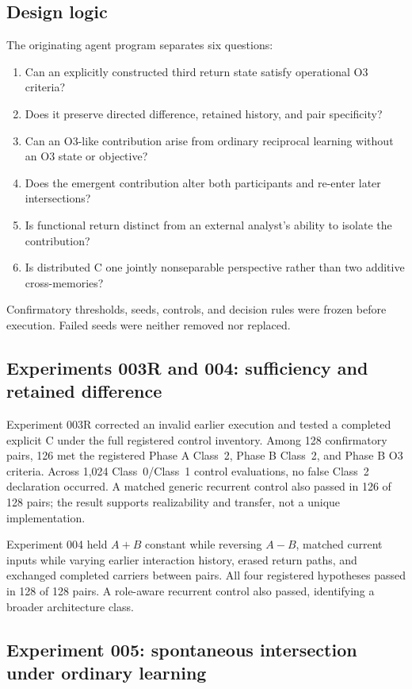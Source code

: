 \documentclass[11pt,a4paper]{article}
\begin{document}
\subsection{Design logic}

The originating agent program separates six questions:
\begin{enumerate}
  \item Can an explicitly constructed third return state satisfy operational O3 criteria?
  \item Does it preserve directed difference, retained history, and pair specificity?
  \item Can an O3-like contribution arise from ordinary reciprocal learning without an O3 state or objective?
  \item Does the emergent contribution alter both participants and re-enter later intersections?
  \item Is functional return distinct from an external analyst's ability to isolate the contribution?
  \item Is distributed C one jointly nonseparable perspective rather than two additive cross-memories?
\end{enumerate}
Confirmatory thresholds, seeds, controls, and decision rules were frozen before execution. Failed seeds were neither removed nor replaced.

\subsection{Experiments 003R and 004: sufficiency and retained difference}

Experiment 003R corrected an invalid earlier execution and tested a completed explicit C under the full registered control inventory. Among 128 confirmatory pairs, 126 met the registered Phase A Class~2, Phase B Class~2, and Phase B O3 criteria. Across 1,024 Class~0/Class~1 control evaluations, no false Class~2 declaration occurred. A matched generic recurrent control also passed in 126 of 128 pairs; the result supports realizability and transfer, not a unique implementation.

Experiment 004 held $A+B$ constant while reversing $A-B$, matched current inputs while varying earlier interaction history, erased return paths, and exchanged completed carriers between pairs. All four registered hypotheses passed in 128 of 128 pairs. A role-aware recurrent control also passed, identifying a broader architecture class.

\subsection{Experiment 005: spontaneous intersection under ordinary learning}
\end{document}

